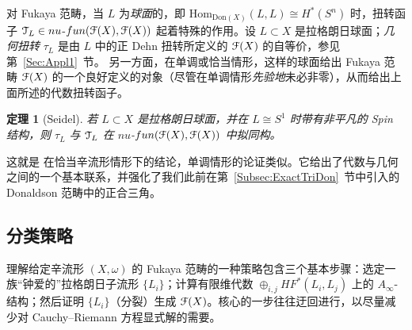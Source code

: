 \documentclass[11pt,a4paper]{article}
\numberwithin{equation}{section}
\newtheorem{Theorem}[thm]{定理}
\newcommand{\scrT}{\EuScript{T}}
\newcommand{\scrF}{\EuScript{F}}
\newcommand{\Hom}{\mathrm{Hom}}
\begin{document}
对 Fukaya 范畴，当 $L$ 为\emph{球面}的，即 $\Hom_{\mathrm{Don}(X)}(L,L) \cong H^*(S^n)$ 时，扭转函子 $\scrT_L \in nu$-$fun(\scrF(X),\scrF(X))$ 起着特殊的作用。设 $L\subset X$ 是拉格朗日球面；\emph{几何扭转} $\tau_L$ 是由 $L$ 中的正 Dehn 扭转所定义的 $\scrF(X)$ 的自等价，参见第~\ref{Sec:Appl1}~节。
另一方面，在单调或恰当情形，这样的球面给出 Fukaya 范畴 $\scrF(X)$ 的一个良好定义的对象（尽管在单调情形\emph{先验地}未必非零），从而给出上面所述的代数扭转函子。

\begin{Theorem}[Seidel] \label{Prop:twists}
若 $L\subset X$ 是拉格朗日球面，并在 $L \cong S^1$ 时带有非平凡的 \emph{Spin} 结构，则 $\tau_L$ 与 $\scrT_L$ 在 $nu$-$fun(\scrF(X),\scrF(X))$ 中拟同构。
\end{Theorem}

这就是 \cite[Corollary 17.17]{FCPLT} 在恰当辛流形情形下的结论，单调情形的论证类似。它给出了代数与几何之间的一个基本联系，并强化了我们此前在第~\ref{Subsec:ExactTriDon}~节中引入的 Donaldson 范畴中的正合三角。




\subsection{分类策略}

理解给定辛流形 $(X,\omega)$ 的 Fukaya 范畴的一种策略包含三个基本步骤：选定一族“钟爱的”拉格朗日子流形 $\{L_i\}$；计算有限维代数 $\oplus_{i,j} HF^*(L_i, L_j)$ 上的 $A_{\infty}$-结构；然后证明 $\{L_i\}$（分裂）生成 $\scrF(X)$。核心的一步往往迂回进行，以尽量减少对 Cauchy--Riemann 方程显式解的需要。
\end{document}

